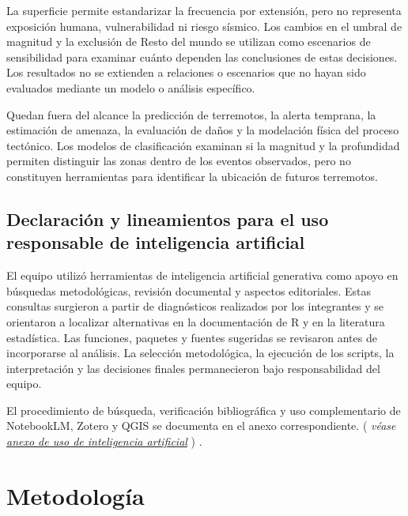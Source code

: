 \documentclass[
  spanish,
  letterpaper,
  DIV=11,
  numbers=noendperiod]{scrartcl}
\newcommand{\asesoriaParenRef}[1]{%
  \textnormal{\textcolor{asesoriaTextColor}{(}}%
  {\hypersetup{linkcolor=asesoriaLinkColor,urlcolor=asesoriaLinkColor,citecolor=asesoriaLinkColor}\textcolor{asesoriaTextColor}{\emph{#1}}}%
  \textnormal{\textcolor{asesoriaTextColor}{)}}%
}
\begin{document}
La superficie permite estandarizar la frecuencia por extensión, pero no
representa exposición humana, vulnerabilidad ni riesgo sísmico. Los
cambios en el umbral de magnitud y la exclusión de Resto del mundo se
utilizan como escenarios de sensibilidad para examinar cuánto dependen
las conclusiones de estas decisiones. Los resultados no se extienden a
relaciones o escenarios que no hayan sido evaluados mediante un modelo o
análisis específico.

Quedan fuera del alcance la predicción de terremotos, la alerta
temprana, la estimación de amenaza, la evaluación de daños y la
modelación física del proceso tectónico. Los modelos de clasificación
examinan si la magnitud y la profundidad permiten distinguir las zonas
dentro de los eventos observados, pero no constituyen herramientas para
identificar la ubicación de futuros terremotos.

\subsection{Declaración y lineamientos para el uso responsable de
inteligencia
artificial}\label{declaraciuxf3n-y-lineamientos-para-el-uso-responsable-de-inteligencia-artificial}

El equipo utilizó herramientas de inteligencia artificial generativa
como apoyo en búsquedas metodológicas, revisión documental y aspectos
editoriales. Estas consultas surgieron a partir de diagnósticos
realizados por los integrantes y se orientaron a localizar alternativas
en la documentación de R y en la literatura estadística. Las funciones,
paquetes y fuentes sugeridas se revisaron antes de incorporarse al
análisis. La selección metodológica, la ejecución de los scripts, la
interpretación y las decisiones finales permanecieron bajo
responsabilidad del equipo.

El procedimiento de búsqueda, verificación bibliográfica y uso
complementario de NotebookLM, Zotero y QGIS se documenta en el anexo
correspondiente.
\asesoriaParenRef{véase \hyperref[sec-anexo-declaracion-ia]{anexo de uso de inteligencia artificial}}.

\section{Metodología}\label{metodologuxeda}
\end{document}
